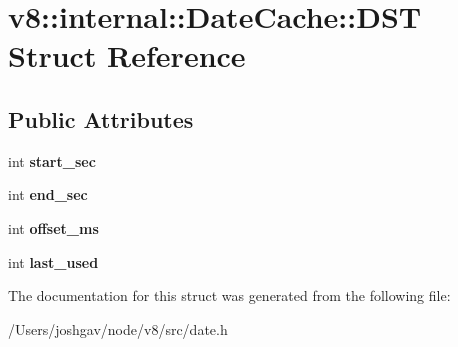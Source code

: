 \hypertarget{structv8_1_1internal_1_1_date_cache_1_1_d_s_t}{}\section{v8\+:\+:internal\+:\+:Date\+Cache\+:\+:D\+ST Struct Reference}
\label{structv8_1_1internal_1_1_date_cache_1_1_d_s_t}
\subsection*{Public Attributes}
\begin{DoxyCompactItemize}
\item 
int {\bfseries start\+\_\+sec}\hypertarget{structv8_1_1internal_1_1_date_cache_1_1_d_s_t_ac42e75e1d94a5bc2cbaccd7abe9b6912}{}\label{structv8_1_1internal_1_1_date_cache_1_1_d_s_t_ac42e75e1d94a5bc2cbaccd7abe9b6912}

\item 
int {\bfseries end\+\_\+sec}\hypertarget{structv8_1_1internal_1_1_date_cache_1_1_d_s_t_a76aac06c85fc82dc77af97a90bfb3035}{}\label{structv8_1_1internal_1_1_date_cache_1_1_d_s_t_a76aac06c85fc82dc77af97a90bfb3035}

\item 
int {\bfseries offset\+\_\+ms}\hypertarget{structv8_1_1internal_1_1_date_cache_1_1_d_s_t_aa334a4bd1f1d894836edf8267d2976e3}{}\label{structv8_1_1internal_1_1_date_cache_1_1_d_s_t_aa334a4bd1f1d894836edf8267d2976e3}

\item 
int {\bfseries last\+\_\+used}\hypertarget{structv8_1_1internal_1_1_date_cache_1_1_d_s_t_a4fd62c240b15e64f0fd2a43152264865}{}\label{structv8_1_1internal_1_1_date_cache_1_1_d_s_t_a4fd62c240b15e64f0fd2a43152264865}

\end{DoxyCompactItemize}


The documentation for this struct was generated from the following file\+:\begin{DoxyCompactItemize}
\item 
/\+Users/joshgav/node/v8/src/date.\+h\end{DoxyCompactItemize}

